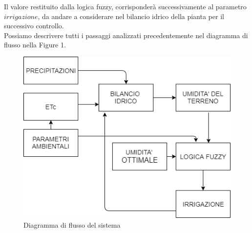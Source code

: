 \documentclass[conference,10pt]{IEEEtran}
\begin{document}
Il valore restituito dalla logica fuzzy, corrisponderà successivamente al parametro $irrigazione$, da andare a considerare nel bilancio idrico della pianta per il successivo controllo.\\
Possiamo descrivere tutti i passaggi analizzati precedentemente nel diagramma di flusso nella Figure 1.\vspace*{0.1 cm}
\begin{figure}[ht]
	\centering
	\includegraphics[width=0.8\linewidth]{images/flusso.png}
	\caption{Diagramma di flusso del sistema}
	\label{fig:flusso}
\end{figure}
\end{document}
